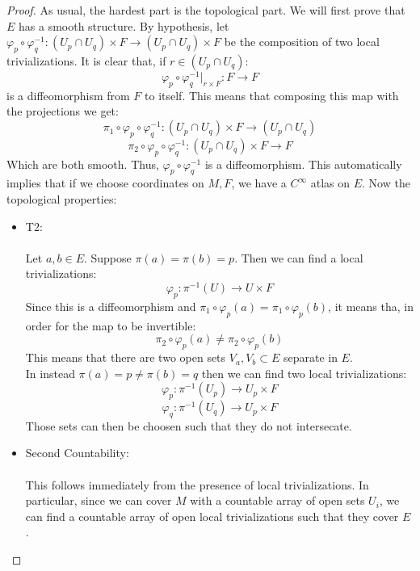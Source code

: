 \documentclass[12pt,a4paper]{report}
\theoremstyle{definition}
\theoremstyle{Theorem}
\theoremstyle{definition}
\theoremstyle{definition}
\begin{document}
	\begin{proof}
		As usual, the hardest part is the topological part. We will first prove that $E$ has a smooth structure. By hypothesis, let $\varphi_p\circ \varphi_q^{-1}:(U_p\cap U_q)\times F\rightarrow (U_p\cap U_q)\times F$ be the composition of two local trivializations. It is clear that, if $r\in (U_p\cap U_q)$:
		$$\varphi_p\circ \varphi_q^{-1}\bigg|_{r\times F}:F\longrightarrow F$$
		is a diffeomorphism from $F$ to itself. This means that composing this map with the projections we get:
		$$\pi_1\circ \varphi_p\circ \varphi_q^{-1}:(U_p\cap U_q)\times F\rightarrow (U_p\cap U_q)$$
		$$\pi_2\circ \varphi_p\circ \varphi_q^{-1}:(U_p\cap U_q)\times F\rightarrow F$$
		Which are both smooth. Thus, $\varphi_p\circ \varphi_q^{-1}$ is a diffeomorphism. This automatically implies that if we choose coordinates on $M,F$, we have a $C^\infty$ atlas on $E$. Now the topological properties:
		\begin{itemize}
			\item T2:\\
			\\
			Let $a,b\in E$. Suppose $\pi(a)=\pi(b)=p$. Then we can find a local trivializations:
			$$\varphi_p:\pi^{-1}(U)\rightarrow U\times F$$
			Since this is a diffeomorphism and $\pi_1\circ \varphi_p(a)=\pi_1\circ\varphi_p(b)$, it means tha, in order for the map to be invertible:
			$$\pi_2\circ \varphi_p(a)\neq \pi_2\circ \varphi_p(b)$$
			This means that there are two open sets $V_a,V_b\subset E$ separate in $E$.\\
			In instead $\pi(a)=p\neq \pi(b)=q$ then we can find two local trivializations:
			$$\varphi_p:\pi^{-1}(U_p)\rightarrow U_p\times F$$
			$$\varphi_q:\pi^{-1}(U_q)\rightarrow U_p\times F$$
			Those sets can then be choosen such that they do not intersecate.
			\item Second Countability:\\
			\\
			This follows immediately from the presence of local trivializations. In particular, since we can cover $M$ with a countable array of open sets $U_i$, we can find a countable array of open local trivializations such that they cover $E$.
		\end{itemize}
	\end{proof}
\end{document}
